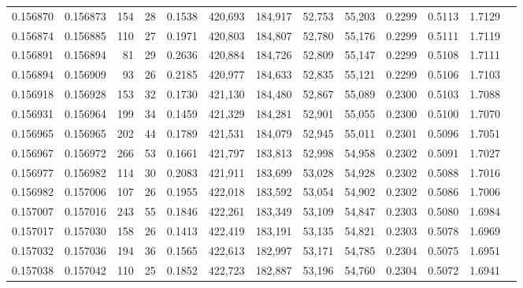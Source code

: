 \begin{tabular}{rrrrrrrrrrrrr}
0.156870 & 0.156873 &   154 &  28 &                                     0.1538 & 420,693 & 184,917 &  52,753 &  55,203 & 0.2299 & 0.5113 & 1.7129 \\
0.156874 & 0.156885 &   110 &  27 &                                     0.1971 & 420,803 & 184,807 &  52,780 &  55,176 & 0.2299 & 0.5111 & 1.7119 \\
0.156891 & 0.156894 &    81 &  29 &                                     0.2636 & 420,884 & 184,726 &  52,809 &  55,147 & 0.2299 & 0.5108 & 1.7111 \\
0.156894 & 0.156909 &    93 &  26 &                                     0.2185 & 420,977 & 184,633 &  52,835 &  55,121 & 0.2299 & 0.5106 & 1.7103 \\
0.156918 & 0.156928 &   153 &  32 &                                     0.1730 & 421,130 & 184,480 &  52,867 &  55,089 & 0.2300 & 0.5103 & 1.7088 \\
0.156931 & 0.156964 &   199 &  34 &                                     0.1459 & 421,329 & 184,281 &  52,901 &  55,055 & 0.2300 & 0.5100 & 1.7070 \\
0.156965 & 0.156965 &   202 &  44 &                                     0.1789 & 421,531 & 184,079 &  52,945 &  55,011 & 0.2301 & 0.5096 & 1.7051 \\
0.156967 & 0.156972 &   266 &  53 &                                     0.1661 & 421,797 & 183,813 &  52,998 &  54,958 & 0.2302 & 0.5091 & 1.7027 \\
0.156977 & 0.156982 &   114 &  30 &                                     0.2083 & 421,911 & 183,699 &  53,028 &  54,928 & 0.2302 & 0.5088 & 1.7016 \\
0.156982 & 0.157006 &   107 &  26 &                                     0.1955 & 422,018 & 183,592 &  53,054 &  54,902 & 0.2302 & 0.5086 & 1.7006 \\
0.157007 & 0.157016 &   243 &  55 &                                     0.1846 & 422,261 & 183,349 &  53,109 &  54,847 & 0.2303 & 0.5080 & 1.6984 \\
0.157017 & 0.157030 &   158 &  26 &                                     0.1413 & 422,419 & 183,191 &  53,135 &  54,821 & 0.2303 & 0.5078 & 1.6969 \\
0.157032 & 0.157036 &   194 &  36 &                                     0.1565 & 422,613 & 182,997 &  53,171 &  54,785 & 0.2304 & 0.5075 & 1.6951 \\
0.157038 & 0.157042 &   110 &  25 &                                     0.1852 & 422,723 & 182,887 &  53,196 &  54,760 & 0.2304 & 0.5072 & 1.6941 \\

\end{tabular}

